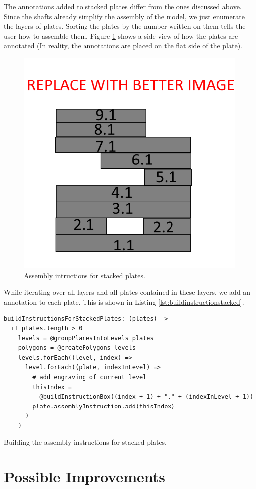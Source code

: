 \documentclass[../ClassicThesis.tex]{subfiles}
\begin{document}
The annotations added to stacked plates differ from the ones discussed above. Since the shafts already simplify the assembly of the model, we just enumerate the layers of plates. Sorting the plates by the number written on them tells the user how to assemble them. Figure \ref{fig:assemblystacked} shows a side view of how the plates are annotated (In reality, the annotations are placed on the flat side of the plate).

\begin{figure}
    \centering
    \includegraphics[width=0.5\columnwidth]{Images/assembly_stacked.png}
    \caption{Assembly intructions for stacked plates.}
    \label{fig:assemblystacked}
\end{figure}

While iterating over all layers and all plates contained in these layers, we add an annotation to each plate. This is shown in Listing \ref{lst:buildinstructionstacked}.

\begin{listing}
\begin{verbatim}
buildInstructionsForStackedPlates: (plates) ->
  if plates.length > 0
    levels = @groupPlanesIntoLevels plates
    polygons = @createPolygons levels
    levels.forEach((level, index) =>
      level.forEach((plate, indexInLevel) =>
        # add engraving of current level
        thisIndex =
          @buildInstructionBox((index + 1) + "." + (indexInLevel + 1))
        plate.assemblyInstruction.add(thisIndex)
      )
    )
\end{verbatim}
\caption{Building the assembly instructions for stacked plates.}
\label{lst:buildinstructionstacked}
\end{listing}

\section{Possible Improvements}\label{sec:assemblyimprovements}
\end{document}

